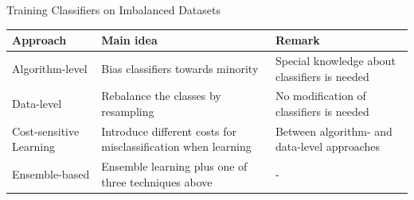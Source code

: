 \documentclass[11pt,compress,t,notes=noshow, xcolor=table]{beamer}
\begin{document}
\begin{vbframe}{Training Classifiers on Imbalanced Datasets}
\small
\begin{table}[h]
    \centering
    \begin{tabular}{p{} p{} p{}}
        \toprule
        \textbf{Approach} & \textbf{Main idea} & \textbf{Remark} \\ [5pt]
        \hline
        Algorithm-level & Bias classifiers towards minority & Special knowledge about classifiers is needed \\ [5pt]
        \hline
        Data-level & Rebalance the classes by resampling & No modification of classifiers is needed \\ [5pt]
        \hline
        Cost-sensitive Learning & Introduce different costs for misclassification when learning & Between algorithm- and data-level approaches \\ [15pt]
        \hline
        Ensemble-based & Ensemble learning plus one of three techniques above & - \\ [5pt]
        \bottomrule
    \end{tabular}
\end{table}

\end{vbframe}



\endlecture
\end{document}
